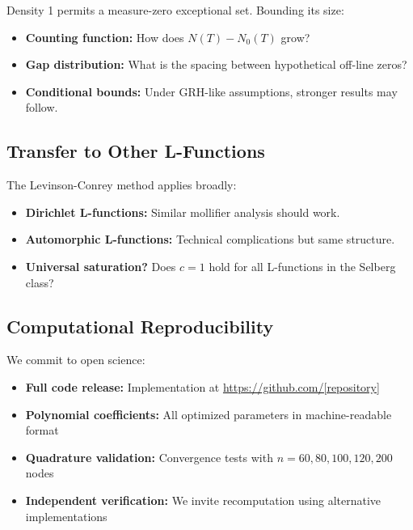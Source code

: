 \documentclass[11pt]{article}
\begin{document}
Density 1 permits a measure-zero exceptional set. Bounding its size:

\begin{itemize}
\item \textbf{Counting function:} How does $N(T) - N_0(T)$ grow?
\item \textbf{Gap distribution:} What is the spacing between hypothetical off-line zeros?
\item \textbf{Conditional bounds:} Under GRH-like assumptions, stronger results may follow.
\end{itemize}

\subsection{Transfer to Other L-Functions}

The Levinson-Conrey method applies broadly:

\begin{itemize}
\item \textbf{Dirichlet L-functions:} Similar mollifier analysis should work.
\item \textbf{Automorphic L-functions:} Technical complications but same structure.
\item \textbf{Universal saturation?} Does $c = 1$ hold for all L-functions in the Selberg class?
\end{itemize}

\subsection{Computational Reproducibility}

We commit to open science:

\begin{itemize}
\item \textbf{Full code release:} Implementation at \url{https://github.com/[repository]}
\item \textbf{Polynomial coefficients:} All optimized parameters in machine-readable format
\item \textbf{Quadrature validation:} Convergence tests with $n = 60, 80, 100, 120, 200$ nodes
\item \textbf{Independent verification:} We invite recomputation using alternative implementations
\end{itemize}

\appendix
\end{document}
